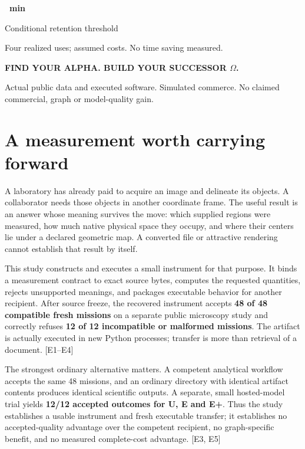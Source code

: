 \documentclass[10pt,a4paper]{article}
\begin{document}
\begin{titlepage}
\begin{minipage}[t]{0.31\textwidth}\raggedright
{\sffamily\fontsize{24}{26}\selectfont\bfseries\color{teal}\RetentionMinutes\ min}\par
{\sffamily\small Conditional retention threshold}\par
{\footnotesize Four realized uses; assumed costs. No time saving measured.}
\end{minipage}\par
\vspace{13mm}
{\sffamily\small\bfseries\color{teal}FIND YOUR ALPHA. BUILD YOUR SUCCESSOR \(\Omega\).}\par
{\footnotesize Actual public data and executed software. Simulated commerce. No claimed commercial, graph or model-quality gain.}
\end{titlepage}
\nopagecolor
\setcounter{page}{2}
\hypertarget{a-measurement-worth-carrying-forward}{%
\section{A measurement worth carrying
forward}\label{a-measurement-worth-carrying-forward}}

A laboratory has already paid to acquire an image and delineate its
objects. A collaborator needs those objects in another coordinate frame.
The useful result is an answer whose meaning survives the move: which
supplied regions were measured, how much native physical space they
occupy, and where their centers lie under a declared geometric map. A
converted file or attractive rendering cannot establish that result by
itself.

This study constructs and executes a small instrument for that purpose.
It binds a measurement contract to exact source bytes, computes the
requested quantities, rejects unsupported meanings, and packages
executable behavior for another recipient. After source freeze, the
recovered instrument accepts \textbf{48 of 48 compatible fresh missions}
on a separate public microscopy study and correctly refuses \textbf{12
of 12 incompatible or malformed missions}. The artifact is actually
executed in new Python processes; transfer is more than retrieval of a
document. {[}E1--E4{]}

The strongest ordinary alternative matters. A competent analytical
workflow accepts the same 48 missions, and an ordinary directory with
identical artifact contents produces identical scientific outputs. A
separate, small hosted-model trial yields \textbf{12/12 accepted
outcomes for U, E and E+}. Thus the study establishes a usable
instrument and fresh executable transfer; it establishes no
accepted-quality advantage over the competent recipient, no
graph-specific benefit, and no measured complete-cost advantage. {[}E3,
E5{]}
\end{document}
